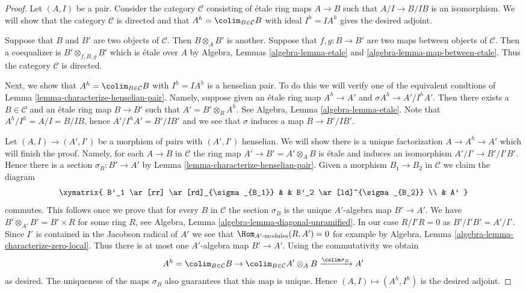 \begin{proof}
Let $(A, I)$ be a pair. Consider the category $\mathcal{C}$ consisting
of \'etale ring maps $A \to B$ such that $A/I \to B/IB$ is an isomorphism.
We will show that the category $\mathcal{C}$ is directed and that
$A^h = \colim_{B \in \mathcal{C}} B$ with ideal $I^h = IA^h$ gives
the desired adjoint.

\medskip\noindent
Suppose that $B$ and $B'$ are two objects of $\mathcal{C}$.
Then $B \otimes_A B'$ is another. Suppose that $f, g : B \to B'$
are two maps between objects of $\mathcal{C}$. Then a coequalizer is
$B' \otimes_{f, B, g} B'$ which is \'etale over $A$ by
Algebra, Lemmas \ref{algebra-lemma-etale} and
\ref{algebra-lemma-map-between-etale}.
Thus the category $\mathcal{C}$ is directed.

\medskip\noindent
Next, we show that $A^h = \colim_{B \in \mathcal{C}} B$ with
$I^h = IA^h$ is a henselian pair. To do this we will verify one
of the equivalent condtions of Lemma \ref{lemma-characterize-henselian-pair}.
Namely, suppose given an \'etale ring map $A^h \to A'$ and
$\sigma A^h \to A'/I^hA'$. Then there exists a $B \in \mathcal{C}$
and an \'etale ring map $B \to B'$ such that $A' = B' \otimes_B A^h$.
See Algebra, Lemma \ref{algebra-lemma-etale}.
Note that $A^h/I^h = A/I = B/IB$, hence $A'/I^hA' = B'/IB'$ and
we see that $\sigma$ induces a map $B \to B'/IB'$.

\medskip\noindent
Let $(A, I) \to (A', I')$ be a morphism of pairs with $(A', I')$ henselian.
We will show there is a unique factorization $A \to A^h \to A'$ which will
finish the proof. Namely, for each $A \to B$ in $\mathcal{C}$
the ring map $A' \to B' = A' \otimes_A B$ is \'etale and induces
an isomorphism $A'/I' \to B'/I'B'$. Hence there is a section
$\sigma_B : B' \to A'$ by Lemma \ref{lemma-characterize-henselian-pair}.
Given a morphism $B_1 \to B_2$ in $\mathcal{C}$ we claim the diagram
$$
\xymatrix{
B'_1 \ar[rr] \ar[rd]_{\sigma_{B_1}} & &
B'_2 \ar[ld]^{\sigma_{B_2}} \\
& A'
}
$$
commutes. This follows once we prove that for every $B$ in $\mathcal{C}$
the section $\sigma_B$ is the unique $A'$-algebra map $B' \to A'$.
We have $B' \otimes_{A'} B' = B' \times R$ for some ring $R$, see
Algebra, Lemma \ref{algebra-lemma-diagonal-unramified}. In our case
$R/I'R = 0$ as $B'/I'B' = A'/I'$. Since $I'$ is contained in the Jacobson
radical of $A'$ we see that $\Hom_{A'\text{-modules}}(R, A') = 0$ for example
by Algebra, Lemma \ref{algebra-lemma-characterize-zero-local}.
Thus there is at most one $A'$-algebra map $B' \to A'$.
Using the commutativity we obtain
$$
A^h = \colim_{B \in \mathcal{C}} B \to
\colim_{B \in \mathcal{C}} A' \otimes_A B \xrightarrow{\colim \sigma_B} A'
$$
as desired. The uniqueness of the maps $\sigma_B$ also guarantees that
this map is unique. Hence $(A, I) \mapsto (A^h, I^h)$ is the desired adjoint.
\end{proof}

